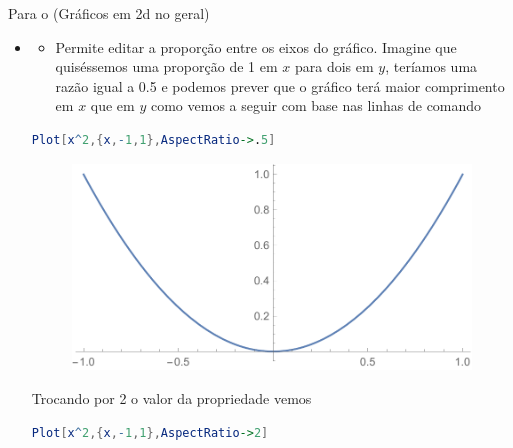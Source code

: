 \documentclass[a4paper, 12pt]{article}
\begin{document}
	\vspace{.5cm}
	Para o  (Gráficos em 2d no geral) 
	\begin{itemize}
		\item{}
		\begin{itemize}
		\item Permite editar a proporção entre os eixos do gráfico. Imagine que quiséssemos uma proporção de 1 em $x$ para dois em $y$, teríamos uma razão igual a 0.5 e podemos prever que o gráfico terá maior comprimento em $x$ que em $y$ como vemos a seguir com base nas linhas de comando
		\end{itemize}
	
\begin{lstlisting}[language=Mathematica]
Plot[x^2,{x,-1,1},AspectRatio->.5]
\end{lstlisting}
		
		\begin{figure}[!h]
			\centering
			\includegraphics[scale=.55]{images/aspecthalf}
		\end{figure}
		
		Trocando por 2 o valor da propriedade vemos
		
\begin{lstlisting}[language=Mathematica]
Plot[x^2,{x,-1,1},AspectRatio->2]
\end{lstlisting}
		

\end{itemize}
\end{document}
